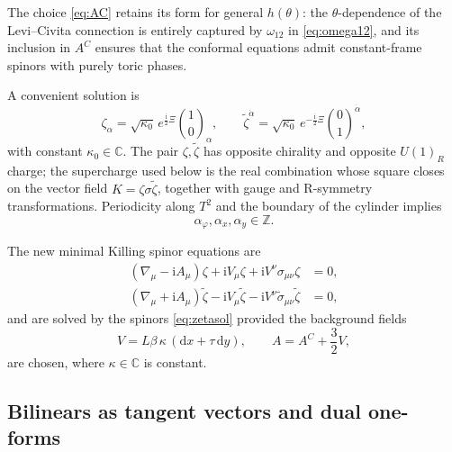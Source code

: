 \documentclass[11pt,a4paper]{article}
\numberwithin{equation}{section}
\theoremstyle{plain}
\theoremstyle{definition}
\theoremstyle{remark}
\newcommand{\ii}{\mathrm{i}}
\newcommand{\dd}{\mathrm{d}}
\begin{document}
The choice \eqref{eq:AC} retains its form for general $h(\theta)$: the $\theta$-dependence of the Levi--Civita connection is entirely captured by $\omega_{12}$ in \eqref{eq:omega12}, and its inclusion in $A^C$ ensures that the conformal equations admit constant-frame spinors with purely toric phases.

A convenient solution is
\begin{equation}
\zeta_\alpha=\sqrt{\kappa_0}\,e^{\frac{\ii}{2}\Xi}\binom{1}{0}_\alpha,\qquad
\widetilde\zeta^{\dot\alpha}=\sqrt{\kappa_0}\,e^{-\frac{\ii}{2}\Xi}\binom{0}{1}^{\dot\alpha},
\label{eq:zetasol}
\end{equation}
with constant $\kappa_0\in\mathbb{C}$.  The pair \(\zeta,\widetilde\zeta\) has opposite chirality and opposite \(U(1)_R\) charge; the supercharge used below is the real combination whose square closes on the vector field \(K=\zeta\sigma\widetilde\zeta\), together with gauge and R-symmetry transformations. Periodicity along $T^2$ and the boundary of the cylinder implies
\begin{equation}
\alpha_\varphi, \alpha_x, \alpha_y\in\mathbb{Z}.
\label{eq:alphaint}
\end{equation}


The new minimal Killing spinor equations are~\cite{Sohnius:1981tp,Festuccia:2011ws,Dumitrescu:2012ha}
\begin{align}
(\nabla_\mu-\ii A_\mu)\zeta+\ii V_\mu\zeta+\ii V^\nu\sigma_{\mu\nu}\zeta&=0,
\label{eq:KSE1}\\
(\nabla_\mu+\ii A_\mu)\widetilde\zeta-\ii V_\mu\widetilde\zeta-\ii V^\nu\widetilde\sigma_{\mu\nu}\widetilde\zeta&=0,
\label{eq:KSE2}
\end{align}
and are solved by the spinors \eqref{eq:zetasol} provided the background fields
\begin{equation}
V=L\beta\,\kappa\,(\dd x+\tau\,\dd y),\qquad
A=A^C+\frac32 V,
\label{eq:AV}
\end{equation}
are chosen, where $\kappa\in\mathbb{C}$ is constant.

\subsection{Bilinears as tangent vectors and dual one-forms}
\end{document}
